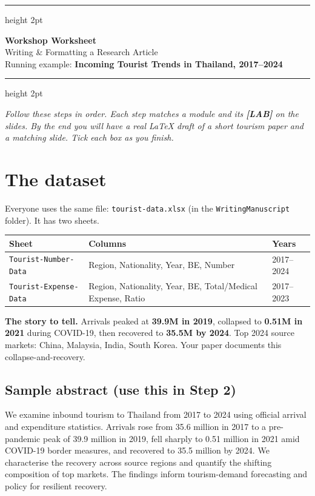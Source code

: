 \documentclass[11pt]{article}
\begin{document}
{\color{chulapink}\hrule height 2pt}
\vspace{0.6em}
{\Huge\bfseries\color{chulapinkdk}Workshop Worksheet}\\[0.3em]
{\Large Writing \& Formatting a Research Article}\\[0.2em]
{\large Running example: \textbf{Incoming Tourist Trends in Thailand, 2017--2024}}
\vspace{0.5em}
{\color{chulapink}\hrule height 2pt}
\vspace{0.6em}

\textit{Follow these steps in order. Each step matches a module and its \textbf{[LAB]} on the slides.
By the end you will have a real LaTeX draft of a short tourism paper \emph{and} a matching slide. Tick each box as you finish.}

\section{The dataset}

Everyone uses the same file: \texttt{tourist-data.xlsx} (in the \texttt{WritingManuscript} folder). It has two sheets.

\begin{center}\small
\begin{tabular}{@{}lll@{}}
\toprule
\textbf{Sheet} & \textbf{Columns} & \textbf{Years} \\
\midrule
\texttt{Tourist-Number-Data} & Region, Nationality, Year, BE, Number & 2017--2024 \\
\texttt{Tourist-Expense-Data} & Region, Nationality, Year, BE, Total/Medical Expense, Ratio & 2017--2023 \\
\bottomrule
\end{tabular}
\end{center}

\textbf{The story to tell.} Arrivals peaked at \textbf{39.9M in 2019}, collapsed to \textbf{0.51M in 2021}
during COVID-19, then recovered to \textbf{35.5M by 2024}. Top 2024 source markets: China, Malaysia,
India, South Korea. Your paper documents this collapse-and-recovery.

\subsection*{Sample abstract (use this in Step 2)}
\begin{tcolorbox}[colback=softbg,colframe=chulapink!50,boxrule=0.5pt,arc=2pt]
\small
We examine inbound tourism to Thailand from 2017 to 2024 using official arrival and expenditure
statistics. Arrivals rose from 35.6 million in 2017 to a pre-pandemic peak of 39.9 million in 2019,
fell sharply to 0.51 million in 2021 amid COVID-19 border measures, and recovered to 35.5 million by
2024. We characterise the recovery across source regions and quantify the shifting composition of
top markets. The findings inform tourism-demand forecasting and policy for resilient recovery.
\end{tcolorbox}
\end{document}
